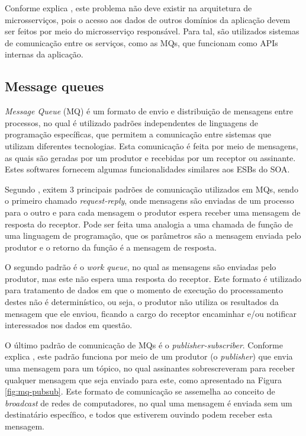 Conforme explica , este problema não deve existir
na arquitetura de microsserviços, pois o acesso aos dados de outros
domínios da aplicação devem ser feitos por meio do microsserviço responsável.
Para tal, são utilizados sistemas de comunicação entre os serviços, como
as \acp{MQ}, que funcionam como \acp{API} internas da aplicação.

\subsection{Message queues}

\emph{Message Queue} (MQ) é um formato de envio e distribuição de mensagens
entre processos, no qual é utilizado padrões independentes de linguagens
de programação específicas, que permitem a comunicação entre sistemas que
utilizam diferentes tecnologias. Esta comunicação é feita por meio de
mensagens, as quais são geradas por um produtor e recebidas por um receptor
ou assinante. Estes softwares fornecem algumas funcionalidades similares aos
\acp{ESB} do \ac{SOA}.

Segundo , exitem 3 principais padrões de comunicação
utilizados em \acp{MQ}, sendo o primeiro chamado \emph{request-reply}, onde
mensagens são enviadas de um processo para o outro e para cada mensagem o
produtor espera receber uma mensagem de resposta do receptor. Pode ser feita
uma analogia a uma chamada de função de uma linguagem de programação, que os
parâmetros são a mensagem enviada pelo produtor e o retorno da função é a
mensagem de resposta.

O segundo padrão é o \emph{work queue}, no qual as mensagens são enviadas pelo
produtor, mas este não espera uma resposta do receptor. Este formato é
utilizado para tratamento de dados em que o momento de execução do
processamento destes não é determinístico, ou seja, o produtor não utiliza
os resultados da mensagem que ele enviou, ficando a cargo do receptor
encaminhar e/ou notificar interessados nos dados em questão.

O último padrão de comunicação de \acp{MQ} é o \emph{publisher-subscriber}.
Conforme explica , este padrão funciona por meio de
um produtor (o \emph{publisher}) que envia uma mensagem para um tópico, no
qual assinantes sobrescreveram para receber qualquer mensagem que seja
enviado para este, como apresentado na Figura \ref{fig:mq-pubsub}. Este
formato de comunicação se assemelha ao conceito de \emph{broadcast} de redes
de computadores, no qual uma mensagem é enviada sem um destinatário
específico, e todos que estiverem ouvindo podem receber esta mensagem.

